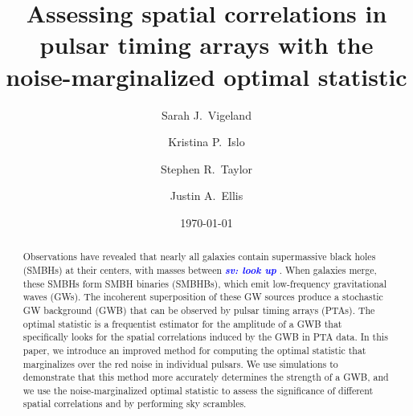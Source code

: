 \documentclass[twocolumn,aps,prd,superscriptaddress]{revtex4-1}
\newcommand{\sv}[1]{\textcolor{blue}{\it{\textbf{sv: #1}}} }
\begin{document}
\title{Assessing spatial correlations in pulsar timing arrays with the noise-marginalized optimal statistic}


\author{Sarah J.\ Vigeland}

\author{Kristina P.\ Islo}

\author{Stephen R.\ Taylor}

\author{Justin A.\ Ellis}

\date{\today}  

\begin{abstract}
Observations have revealed that nearly all galaxies contain supermassive black holes (SMBHs) at their centers, 
with masses between \sv{look up}. 
When galaxies merge, these SMBHs form SMBH binaries (SMBHBs), 
which emit low-frequency gravitational waves (GWs). 
The incoherent superposition of these GW sources produce a stochastic GW background (GWB) 
that can be observed by pulsar timing arrays (PTAs). 
The optimal statistic is a frequentist estimator for the amplitude of a GWB 
that specifically looks for the spatial correlations induced by the GWB in PTA data. 
In this paper, we introduce an improved method for computing the optimal statistic 
that marginalizes over the red noise in individual pulsars. 
We use simulations to demonstrate that this method 
more accurately determines the strength of a GWB, 
and we use the noise-marginalized optimal statistic to assess the 
significance of different spatial correlations and 
by performing sky scrambles.
\end{abstract}

\maketitle
\end{document}
